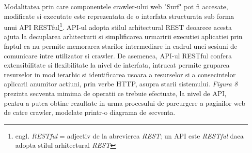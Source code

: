 Modalitatea prin care componentele crawler-ului web "Surf" pot fi accesate, modificate si executate este reprezentata de o interfata\cite{iterface-definition} structurata sub forma unui API RESTful\footnote{engl. \textit{RESTful} = adjectiv de la abrevierea \textit{REST}; un API este \textit{RESTful} daca adopta stilul arhitectural \textit{REST\cite{rest-definition}}}. API-ul adopta stilul arhitectural REST\cite{rest-definition} deoarece acesta ajuta la decuplarea arhitecturii si simplificarea urmaririi executiei aplicatiei prin faptul ca nu permite memorarea starilor intermediare in cadrul unei sesiuni de comunicare intre utilizator si crawler. De asemenea, API-ul RESTful confera extensibilitate si flexibilitate la nivel de interfata, intrucat permite gruparea resurselor in mod ierarhic si identificarea usoara a resurselor si a consecintelor aplicarii anumitor actiuni, prin verbe HTTP, asupra starii sistemului. \textit{Figura 8} prezinta secventa mimima de operatii ce trebuie efectuate, la nivel de API, pentru a putea obtine rezultate in urma procesului de parcurgere a paginilor web de catre crawler, modelate printr-o diagrama de secventa.


